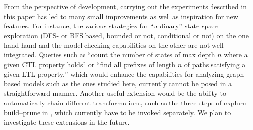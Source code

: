 \medskip\noindent From the perspective of \GROOVE development, carrying out the experiments described in this paper has led to many small improvements as well as inspiration for new features. For instance, the various strategies for ``ordinary'' state space exploration (DFS- or BFS based, bounded or not, conditional or not) on the one hand hand and the model checking capabilities on the other are not well-integrated. Queries such as ``count the number of states of max depth $n$ where a given CTL property holds'' or ``find all prefixes of length $n$ of paths satisfying a given LTL property,'' which would enhance the capabilities for analyzing graph-based models such as the ones studied here, currently cannot be posed in a straightforward manner. Another useful extension would be the ability to automatically chain different transformations, such as the three steps of explore--build--prune in , which currently have to be invoked separately. We plan to investigate these extensions in the future.
